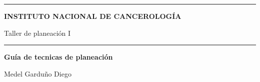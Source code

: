 \documentclass{article}
\begin{document}
\thispagestyle{plain}


\hrule
\begin{center}
    {\Large \textbf{INSTITUTO NACIONAL DE CANCEROLOGÍA}}
    \vspace{10pt}

    {\Large{{Taller de planeación I}}}
    
    
    \vspace{10pt}

    \hrule

    \vspace{20pt}


    {\Huge \textbf{Guía de tecnicas de planeación}}\\
\end{center}

\hdashrule{\linewidth}{1pt}{1mm}

\begin{flushright}
    {\small Medel Garduño Diego} 
\end{flushright}
\end{document}
